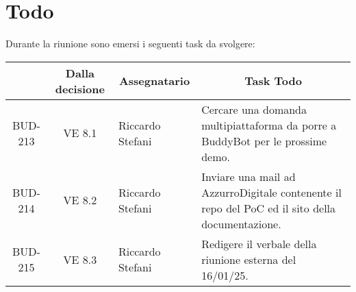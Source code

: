 

\section{Todo}

Durante la riunione sono emersi i seguenti task da svolgere:

\vspace{0.5cm}

\begin{table}[htbp]
\centering
{}
\begin{tabular}{|c|c|p{}|p{}|}
    \hline
    \rowcolor[gray]{0.75}
    \multicolumn{1}{|c|}{\textbf{Codice}} & \multicolumn{1}{|c|}{\textbf{Dalla decisione}} & \multicolumn{1}{|c|}{\textbf{Assegnatario}} & \multicolumn{1}{|c|}{\textbf{Task Todo}} \\
    \hline
    BUD-213 & VE 8.1 & Riccardo Stefani & Cercare una domanda multipiattaforma da porre a BuddyBot per le prossime demo. \\
    \hline
    BUD-214 & VE 8.2 & Riccardo Stefani & Inviare una mail ad AzzurroDigitale contenente il repo del PoC ed il sito della documentazione. \\
    \hline
    BUD-215 & VE 8.3 & Riccardo Stefani & Redigere il verbale della riunione esterna del 16/01/25. \\
    \hline
\end{tabular}
\end{table}

